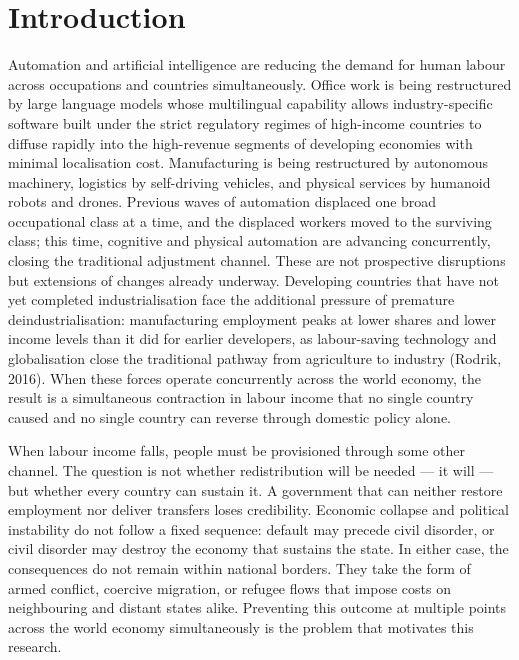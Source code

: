 \documentclass[preprint,review,12pt]{elsarticle}
\begin{document}
\section{Introduction}

Automation and artificial intelligence are reducing the demand for human
labour across occupations and countries simultaneously. Office work is
being restructured by large language models whose multilingual
capability allows industry-specific software built under the strict
regulatory regimes of high-income countries to diffuse rapidly into the
high-revenue segments of developing economies with minimal localisation
cost. Manufacturing is being restructured by
autonomous machinery, logistics by self-driving vehicles, and physical
services by humanoid robots and drones. Previous waves of automation
displaced one broad occupational class at a time, and the displaced
workers moved to the surviving class; this time, cognitive and physical
automation are advancing concurrently, closing the traditional
adjustment channel. These are not prospective disruptions but
extensions of changes already underway. Developing countries that have
not yet completed industrialisation face the additional pressure of
premature deindustrialisation: manufacturing employment peaks at lower
shares and lower income levels than it did for earlier developers, as
labour-saving technology and globalisation close the traditional pathway
from agriculture to industry (Rodrik, 2016). When these forces operate
concurrently across the world economy, the result is a simultaneous
contraction in labour income that no single country caused and no single
country can reverse through domestic policy alone.

When labour income falls, people must be provisioned through some other
channel. The question is not whether redistribution will be needed ---
it will --- but whether every country can sustain it. A government that
can neither restore employment nor deliver transfers loses credibility.
Economic collapse and political instability do not follow a fixed
sequence: default may precede civil disorder, or civil disorder may
destroy the economy that sustains the state. In either case, the
consequences do not remain within national borders. They take the form
of armed conflict, coercive migration, or refugee flows that impose
costs on neighbouring and distant states alike. Preventing this outcome
at multiple points across the world economy simultaneously is the
problem that motivates this research.
\end{document}
